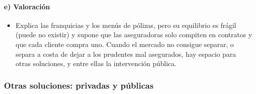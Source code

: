 \documentclass[11pt]{article}
\begin{document}
\paragraph{e) Valoración}

\begin{itemize}
\item Explica las franquicias y los menús de pólizas, pero su equilibrio es frágil (puede no existir) y supone que las aseguradoras solo compiten en contratos y que cada cliente compra uno. Cuando el mercado no consigue separar, o separa a costa de dejar a los prudentes mal asegurados, hay espacio para otras soluciones, y entre ellas la intervención pública.
\end{itemize}

\subsubsection{Otras soluciones: privadas y públicas}\label{sec:otras-soluciones-sa}
\end{document}

